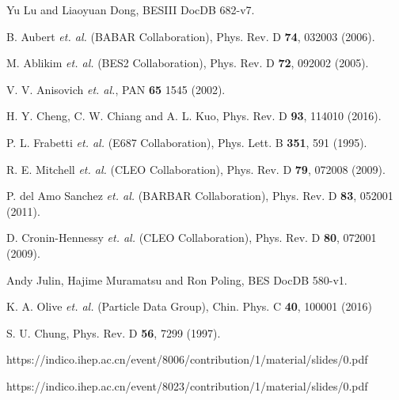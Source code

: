 \newpage
\begin{thebibliography}{99}

Yu Lu and Liaoyuan Dong, 
BESIII DocDB 682-v7.

B. Aubert {\it et. al.} (BABAR Collaboration),
Phys. Rev. D \textbf{74}, 032003 (2006).

M. Ablikim {\it et. al.} (BES2 Collaboration),
Phys. Rev. D \textbf{72}, 092002 (2005).

V. V. Anisovich {\it et. al.},
PAN \textbf{65} 1545 (2002).

    H. Y. Cheng, C. W. Chiang and A. L. Kuo,
    Phys. Rev. D \textbf{93}, 114010 (2016).


%
%
%
    P. L. Frabetti {\it et. al.} (E687 Collaboration),
    Phys. Lett. B \textbf{351}, 591 (1995).

R. E. Mitchell {\it et. al.}  (CLEO Collaboration),
Phys. Rev. D \textbf{79}, 072008 (2009).

P. del Amo Sanchez {\it et. al.} (BARBAR Collaboration),
Phys. Rev. D \textbf{83}, 052001 (2011).


D. Cronin-Hennessy {\it et. al.} (CLEO Collaboration),
Phys. Rev. D \textbf{80}, 072001 (2009).

Andy Julin, Hajime Muramatsu and Ron Poling,  
BES\uppercase\expandafter{} DocDB 580-v1.


K. A. Olive {\it et. al.} (Particle Data Group), 
Chin. Phys. C \textbf{40}, 100001 (2016)

S. U. Chung,
Phys. Rev. D \textbf{56}, 7299 (1997).

https://indico.ihep.ac.cn/event/8006/contribution/1/material/slides/0.pdf

https://indico.ihep.ac.cn/event/8023/contribution/1/material/slides/0.pdf



\end{thebibliography}
